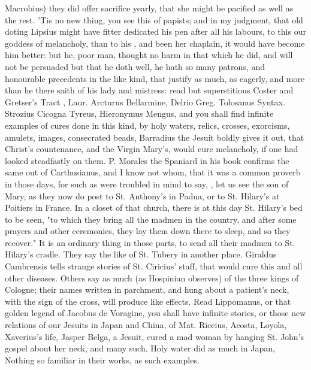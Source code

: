 {Macrobius) they did offer sacrifice yearly, that she might
be pacified as well as the rest. 'Tis no new thing, you see this of papists;
and in my judgment, that old doting Lipsius might have fitter dedicated his
pen after all his labours, to this our goddess of
melancholy, than to his , and been her chaplain, it would
have become him better: but he, poor man, thought no harm in that which he did,
and will not be persuaded but that he doth well, he hath so many patrons, and
honourable precedents in the like kind, that justify as much, as eagerly, and
more than he there saith of his lady and mistress: read but superstitious
Coster and Gretser's Tract , Laur. Arcturus
 Bellarmine, Delrio
 Greg.
Tolosanus  Syntax. Strozius
Cicogna  Tyreus, Hieronymus Mengus, and
you shall find infinite examples of cures done in this kind, by holy waters,
relics, crosses, exorcisms, amulets, images, consecrated beads, \etc{}
Barradius the Jesuit boldly gives it out, that Christ's countenance, and the
Virgin Mary's, would cure melancholy, if one had looked steadfastly on them. P.
Morales the Spaniard in his book 
confirms the same out of Carthusianus, and I know not whom, that it was a
common proverb in those days, for such as were troubled in mind to say,
, let us see the son of Mary, as they now
do post to St. Anthony's in Padua, or to St. Hilary's at Poitiers in France.
In a closet of that church, there is at this day St.
Hilary's bed to be seen, "to which they bring all the madmen in the country,
and after some prayers and other ceremonies, they lay them down there to sleep,
and so they recover." It is an ordinary thing in those parts, to send all their
madmen to St. Hilary's cradle. They say the like of St. Tubery in
another place. Giraldus Cambrensis
 tells strange stories of St. Ciricius'
staff, that would cure this and all other diseases. Others say as much (as
Hospinian observes) of the three kings of Cologne; their
names written in parchment, and hung about a patient's neck, with the sign of
the cross, will produce like effects. Read Lippomanus, or that golden legend of
Jacobus de Voragine, you shall have infinite stories, or those new relations of
our Jesuits in Japan and China, of Mat. Riccius, Acosta,
Loyola, Xaverius's life, \etc{} Jasper Belga, a Jesuit, cured a mad woman by
hanging St. John's gospel about her neck, and many such. Holy water did as much
in Japan, \etc{} Nothing so familiar in their works, as such examples.

}
